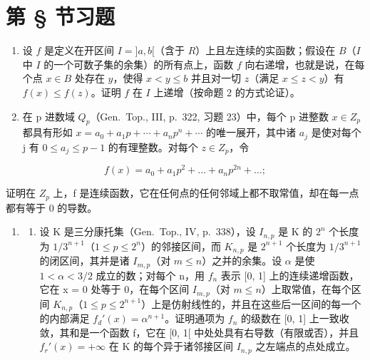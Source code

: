 \section*{第 \S{} 节习题}
{}

\begin{enumerate}
\def\labelenumi{\arabic{enumi})}
\item
  设 \(f\) 是定义在开区间 \(I = ]a, b[\)（含于 \(R\)）上且左连续的实函数；假设在 \(B\)（\(I\) 中 \(I\) 的一个可数子集的余集）的所有点上，函数 \(f\) 向右递增，也就是说，在每个点 \(x \in B\) 处存在 \(y\)，使得 \(x < y \leqslant b\) 并且对一切 \(z\)（满足 \(x \leqslant z < y\)）有 \(f(x) \leqslant f(z)\)。证明 \(f\) 在 \(I\) 上递增（按命题 2 的方式论证）。
\item
  在 p 进数域 \(Q_{p}\)（Gen.~Top., III, p.~322, 习题 23）中，每个 p 进整数 \(x \in Z_{p}\) 都具有形如 \(x = a_{0} + a_{1}p + \cdots + a_{n}p^{n} + \cdots\) 的唯一展开，其中诸 \(a_{j}\) 是使对每个 j 有 \(0 \leqslant a_{j} \leqslant p - 1\) 的有理整数。对每个 \(z \in Z_{p}\)，令
\end{enumerate}

\[
f (x) = a _ {0} + a _ {1} p ^ {2} + \dots + a _ {n} p ^ {2 n} + \dots ;
\]

证明在 \(Z_{p}\) 上，f 是连续函数，它在任何点的任何邻域上都不取常值，却在每一点都有等于 0 的导数。

\begin{enumerate}
\def\labelenumi{\arabic{enumi})}
\setcounter{enumi}{2}
\tightlist
\item
  \begin{enumerate}
  \def\labelenumii{\alph{enumii})}
  \tightlist
  \item
    设 K 是三分康托集（Gen.~Top., IV, p.~338），设 \(I_{n,p}\) 是 K 的 \(2^{n}\) 个长度为 \(1/3^{n+1}\)（\(1 \leqslant p \leqslant 2^{n}\)）的邻接区间，而 \(K_{n,p}\) 是 \(2^{n+1}\) 个长度为 \(1/3^{n+1}\) 的闭区间，其并是诸 \(I_{m,p}\)（对 \(m \leqslant n\)）之并的余集。设 \(\alpha\) 是使 \(1 < \alpha < 3/2\) 成立的数；对每个 n，用 \(f_{n}\) 表示 {[}0, 1{]} 上的连续递增函数，它在 x = 0 处等于 0，在每个区间 \(I_{m,p}\)（对 \(m \leqslant n\)）上取常值，在每个区间 \(K_{n,p}\)（\(1 \leqslant p \leqslant 2^{n+1}\)）上是仿射线性的，并且在这些后一区间的每一个的内部满足 \(f_{d}'(x) = \alpha^{n+1}\)。证明通项为 \(f_{n}\) 的级数在 {[}0, 1{]} 上一致收敛，其和是一个函数 f，它在 {[}0, 1{[} 中处处具有右导数（有限或否），并且 \(f_{r}'(x) = +\infty\) 在 K 的每个异于诸邻接区间 \(I_{n,p}\) 之左端点的点处成立。
  \end{enumerate}
\end{enumerate}

